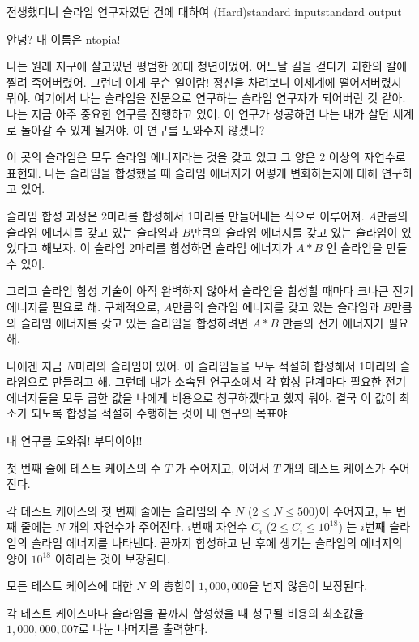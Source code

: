 \begin{problem}{전생했더니 슬라임 연구자였던 건에 대하여 (Hard)}{standard input}{standard output}

안녕? 내 이름은 ntopia!

나는 원래 지구에 살고있던 평범한 20대 청년이었어. 어느날 길을 걷다가 괴한의 칼에 찔려
죽어버렸어. 그런데 이게 무슨 일이람! 정신을 차려보니 이세계에 떨어져버렸지 뭐야.
여기에서 나는 슬라임을 전문으로 연구하는 슬라임 연구자가 되어버린 것 같아.
나는 지금 아주 중요한 연구를 진행하고 있어. 이 연구가 성공하면 나는 내가 살던 세계로
돌아갈 수 있게 될거야. 이 연구를 도와주지 않겠니?

이 곳의 슬라임은 모두 슬라임 에너지라는 것을 갖고 있고 그 양은 2 이상의 자연수로 표현돼.
나는 슬라임을 합성했을 때 슬라임 에너지가 어떻게 변화하는지에 대해 연구하고 있어.

슬라임 합성 과정은 2마리를 합성해서 1마리를 만들어내는 식으로 이루어져.
$A$만큼의 슬라임 에너지를 갖고 있는 슬라임과 $B$만큼의 슬라임 에너지를 갖고 있는
슬라임이 있었다고 해보자. 이 슬라임 2마리를 합성하면
슬라임 에너지가 $A * B$ 인 슬라임을 만들 수 있어.

그리고 슬라임 합성 기술이 아직 완벽하지 않아서 슬라임을 합성할 때마다
크나큰 전기 에너지를 필요로 해. 구체적으로,
$A$만큼의 슬라임 에너지를 갖고 있는 슬라임과 $B$만큼의 슬라임 에너지를 갖고 있는 슬라임을
합성하려면 $A * B$ 만큼의 전기 에너지가 필요해.

나에겐 지금 $N$마리의 슬라임이 있어. 이 슬라임들을 모두 적절히 합성해서
1마리의 슬라임으로 만들려고 해. 그런데 내가 소속된 연구소에서
각 합성 단계마다 필요한 전기 에너지들을 모두 곱한 값을 나에게 비용으로
청구하겠다고 했지 뭐야. 결국 이 값이 최소가 되도록 합성을 적절히 수행하는 것이 내 연구의 목표야.

내 연구를 도와줘! 부탁이야!!

\InputFile
첫 번째 줄에 테스트 케이스의 수 $T$ 가 주어지고, 이어서 $T$ 개의 테스트 케이스가 주어진다.

각 테스트 케이스의 첫 번째 줄에는 슬라임의 수 $N$ ($2 \le N \le 500$)이 주어지고, 두 번째 줄에는 $N$ 개의 자연수가 주어진다. $i$번째 자연수 $C_i$ ($2 \le C_i \le 10^18$) 는 $i$번째 슬라임의 슬라임 에너지를 나타낸다. 끝까지 합성하고 난 후에 생기는 슬라임의 에너지의 양이 $10^18$ 이하라는 것이 보장된다.

모든 테스트 케이스에 대한 $N$ 의 총합이 $1,000,000$을 넘지 않음이 보장된다.

\OutputFile
각 테스트 케이스마다 슬라임을 끝까지 합성했을 때 청구될 비용의 최소값을 $1,000,000,007$로 나눈 나머지를 출력한다.

\Example

\begin{example}
%
\end{example}

\end{problem}
